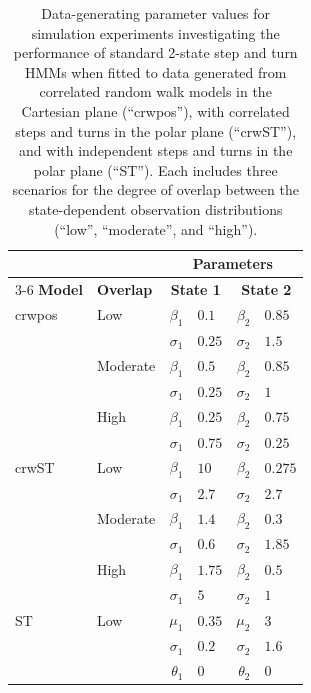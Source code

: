 \documentclass[12pt]{article}\usepackage[]{graphicx}\usepackage[]{xcolor}
\begin{document}
\begin{table}[htpb]
    \centering
    \caption{Data-generating parameter values for simulation experiments investigating the performance of standard 2-state step and turn HMMs when fitted to data generated from correlated random walk models in the Cartesian plane (``crwpos''), with correlated steps and turns in the polar plane (``crwST''), and with independent steps and turns in the polar plane (``ST''). Each includes three scenarios for the degree of overlap between the state-dependent observation distributions (``low'', ``moderate'', and ``high'').}
    \label{tab:sim_scenarios}
    \renewcommand{\arraystretch}{1.1}
    \begin{tabular}{ll r@{\;=\;}l r@{\;=\;}l}
        \toprule
        & & \multicolumn{4}{c}{\textbf{Parameters}} \\
        \cmidrule(l){3-6}
        \textbf{Model} & \textbf{Overlap} & \multicolumn{2}{c}{\textbf{State 1}} & \multicolumn{2}{c}{\textbf{State 2}} \\
        \midrule
        crwpos & Low & $\beta_1$ & $0.1$ & $\beta_2$ & $0.85$ \\
        & & $\sigma_1$ & $0.25$ & $\sigma_2$ & $1.5$ \\
        \addlinespace
        & Moderate & $\beta_1$ & $0.5$ & $\beta_2$ & $0.85$ \\
        & & $\sigma_1$ & $0.25$ & $\sigma_2$ & $1$ \\
        \addlinespace
        & High & $\beta_1$ & $0.25$ & $\beta_2$ & $0.75$ \\
        & & $\sigma_1$ & $0.75$ & $\sigma_2$ & $0.25$ \\
        \midrule
        crwST & Low & $\beta_1$ & $10$ & $\beta_2$ & $0.275$ \\
         & & $\sigma_1$ & $2.7$ & $\sigma_2$ & $2.7$ \\
        \addlinespace
        & Moderate & $\beta_1$ & $1.4$ & $\beta_2$ & $0.3$ \\
        & & $\sigma_1$ & $0.6$ & $\sigma_2$ & $1.85$ \\
        \addlinespace
        & High & $\beta_1$ & $1.75$ & $\beta_2$ & $0.5$ \\
        & & $\sigma_1$ & $5$ & $\sigma_2$ & $1$ \\
        \midrule
        ST & Low & $\mu_1$ & $0.35$ & $\mu_2$ & $3$ \\
         & & $\sigma_1$ & $0.2$ & $\sigma_2$ & $1.6$ \\
        & & $\theta_1$ & $0$ & $\theta_2$ & $0$ \\

\end{tabular}
\end{table}
\end{document}
